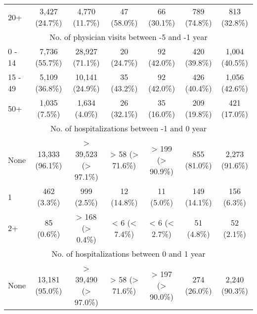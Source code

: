 \documentclass{article}
\begin{document}
\begin{table}[htbp]
\begin{longtable}{l*{6}{c}}
  20+                                                   &          3,427 (24.7\%)         &          4,770 (11.7\%)         &           47 (58.0\%)           &           66 (30.1\%)           &           789 (74.8\%)          &           813 (32.8\%)          \\
\multicolumn{7}{c}{No. of physician visits between -5 and -1 year          }\\
  0 - 14                                                &          7,736 (55.7\%)         &         28,927 (71.1\%)         &           20 (24.7\%)           &           92 (42.0\%)           &           420 (39.8\%)          &          1,004 (40.5\%)         \\
  15 - 49                                               &          5,109 (36.8\%)         &         10,141 (24.9\%)         &           35 (43.2\%)           &           92 (42.0\%)           &           426 (40.4\%)          &          1,056 (42.6\%)         \\
  50+                                                   &          1,035 (7.5\%)          &          1,634 (4.0\%)          &           26 (32.1\%)           &           35 (16.0\%)           &           209 (19.8\%)          &           421 (17.0\%)          \\
\multicolumn{7}{c}{No. of hospitalizations between -1 and 0 year           }\\
  None                                                  &         13,333 (96.1\%)         &       > 39,523 (> 97.1\%)       &         > 58 (> 71.6\%)         &         > 199 (> 90.9\%)        &           855 (81.0\%)          &          2,273 (91.6\%)         \\
  1                                                     &           462 (3.3\%)           &           999 (2.5\%)           &           12 (14.8\%)           &            11 (5.0\%)           &           149 (14.1\%)          &           156 (6.3\%)           \\
  2+                                                    &            85 (0.6\%)           &         > 168 (> 0.4\%)         &          < 6 (< 7.4\%)          &          < 6 (< 2.7\%)          &            51 (4.8\%)           &            52 (2.1\%)           \\
\multicolumn{7}{c}{No. of hospitalizations between 0 and 1 year            }\\
  None                                                  &         13,181 (95.0\%)         &       > 39,490 (> 97.0\%)       &         > 58 (> 71.6\%)         &         > 197 (> 90.0\%)        &           274 (26.0\%)          &          2,240 (90.3\%)         \\

\end{longtable}
\end{table}
\end{document}
